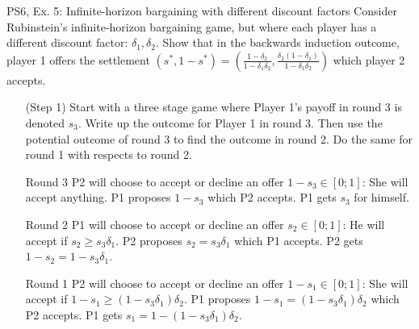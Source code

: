 \begin{frame}{PS6, Ex. 5: Infinite-horizon bargaining with different discount factors}
    Consider Rubinstein's infinite-horizon bargaining game, but where each player has a different discount factor: $\delta_1,\delta_2$. Show that in the backwards induction outcome, player 1 offers the settlement
    $(s^{*},1-s^{*})=\left( \frac{1-\delta_2}{1-\delta_1\delta_2},\frac{\delta_2(1-\delta_1)}{1-\delta_1\delta_2}\right)$
    which player 2 accepts.
    \begin{itemize}
      \item[(Step 1)] Start with a three stage game where Player 1's payoff in round 3 is denoted $s_3$. Write up the outcome for Player 1 in round 3. Then use the potential outcome of round 3 to find the outcome in round 2. Do the same for round 1 with respects to round 2.
    \end{itemize}
    \vfill\null
    \begin{itemize}
        \item[Round 3] P2 will choose to accept or decline an offer $1-s_3\in [0;1]$: She will accept anything. P1 proposes $1-s_3$ which P2 accepts. P1 gets $s_3$ for himself.
        \item[Round 2] P1 will choose to accept or decline an offer $s_2 \in [0;1]$: He will accept if $s_2 \geq s_3\delta_1$. P2 proposes $s_2 = s_3\delta_1$ which P1 accepts. P2 gets $1-s_2 = 1-s_3\delta_1$.
        \item[Round 1] P2 will choose to accept or decline an offer $1-s_1 \in [0;1]$: She will accept if $1-s_1 \geq (1-s_3\delta_1)\delta_2$. P1 proposes $1-s_1 = (1-s_3\delta_1)\delta_2$ which P2 accepts. P1 gets $s_1 =1-(1-s_3\delta_1)\delta_2$.
    \end{itemize}
     \vfill\null
\end{frame}


